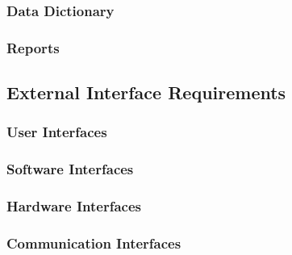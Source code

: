         \subsubsection{Data Dictionary}
        \subsubsection{Reports}

    \subsection{External Interface Requirements}
        \subsubsection{User Interfaces}
        \subsubsection{Software Interfaces}
        \subsubsection{Hardware Interfaces}
        \subsubsection{Communication Interfaces}






